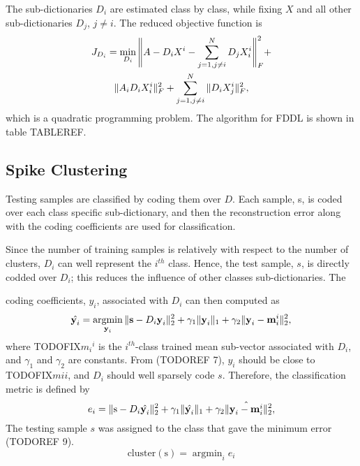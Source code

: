 \documentclass[conference]{IEEEtran}
\DeclareMathOperator*{\argmin}{argmin}
\begin{document}
	The sub-dictionaries $D_i$ are estimated class by class, while fixing $X$ and all other sub-dictionaries $D_j$, $j\neq i$. The reduced objective function is
	\begin{multline}
		J_{D_i}=\min_{D_i}\Bigg\Vert{A-D_iX^i-\sum_{j=1,j\neq i}^{N}D_jX_i^i}\Bigg\Vert_F^2 + \\
		\Vert{A_iD_iX_i^i}\Vert_F^2+\sum_{j=1,j\neq i}^{N}\Vert{D_iX_j^i}\Vert_F^2,
	\end{multline}
	which is a quadratic programming problem. The algorithm for FDDL is shown in table TABLEREF.
	
	\subsection{Spike Clustering}
	Testing samples are classified by coding them over $D$. Each sample, s, is coded over each class specific sub-dictionary, and then the reconstruction error along with the coding coefficients are used for classification.
	
	Since the number of training samples is relatively with respect to the number of clusters, $D_i$ can well represent the $i^{th}$ class. Hence, the test sample, $s$, is directly codded over $D_i$; this reduces the influence of other classes sub-dictionaries. The
	
	 
	coding coefficients, $y_i$, associated with $D_i$ can then computed as
	\begin{equation}
		\hat{\textbf{y}_i}=\argmin_{\textbf{y}_i}\paralleled{\textbf{s}-D_i\textbf{y}_i}_2^2+\gamma_1\paralleled{\textbf{y}_i}_1+\gamma_2\paralleled{\textbf{y}_i-\textbf{m}_i^i}_2^2,
	\end{equation}
	where TODOFIX${m_i}^i$ is the $i^{th}$-class trained mean sub-vector associated with $D_i$, and $\gamma_1$ and $\gamma_2$ are constants. From (TODOREF 7), $y_i$ should be close to TODOFIX$mi i$, and $D_i$ should well sparsely code $s$. Therefore, the classification metric is defined by
	\begin{equation}
		e_i=\Vert{\text{s}-D_i\hat{\textbf{y}_i}}\Vert_2^2+\gamma_1\Vert{\hat{\textbf{y}_i}}\Vert_1+\gamma_2\Vert{\hat{\textbf{y}_i-\textbf{m}_i^i}}\Vert_2^2,
	\end{equation}
	The testing sample $s$ was assigned to the class that gave the minimum error (TODOREF 9).
	\begin{equation}
		\mathrm{cluster(s)}=\argmin_ie_i
	\end{equation}
	
\end{document}
